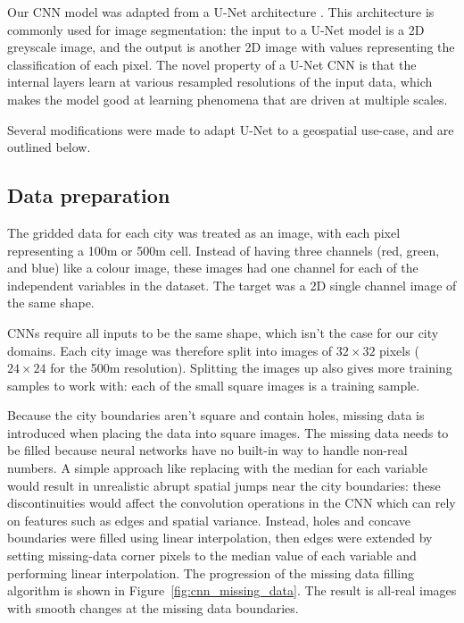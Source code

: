 \documentclass[review]{elsarticle}
\begin{document}
Our CNN model was adapted from a U-Net architecture \cite{unet}. This architecture is commonly used for image segmentation: the input to a U-Net model is a 2D greyscale image, and the output is another 2D image with values representing the classification of each pixel. The novel property of a U-Net CNN is that the internal layers learn at various resampled resolutions of the input data, which makes the model good at learning phenomena that are driven at multiple scales.

Several modifications were made to adapt U-Net to a geospatial use-case, and are outlined below.


\subsection{Data preparation}

The gridded data for each city was treated as an image, with each pixel representing a 100m or 500m cell. Instead of having three channels (red, green, and blue) like a colour image, these images had one channel for each of the independent variables in the dataset. The target was a 2D single channel image of the same shape.

CNNs require all inputs to be the same shape, which isn't the case for our city domains. Each city image was therefore split into images of $32 \times 32$ pixels ($24 \times 24$ for the 500m resolution). Splitting the images up also gives more training samples to work with: each of the small square images is a training sample.

Because the city boundaries aren't square and contain holes, missing data is introduced when placing the data into square images. The missing data needs to be filled because neural networks have no built-in way to handle non-real numbers. A simple approach like replacing with the median for each variable would result in unrealistic abrupt spatial jumps near the city boundaries: these discontinuities would affect the convolution operations in the CNN which can rely on features such as edges and spatial variance. Instead, holes and concave boundaries were filled using linear interpolation, then edges were extended by setting missing-data corner pixels to the median value of each variable and performing linear interpolation. The progression of the missing data filling algorithm is shown in Figure~\ref{fig:cnn_missing_data}. The result is all-real images with smooth changes at the missing data boundaries.
\end{document}
